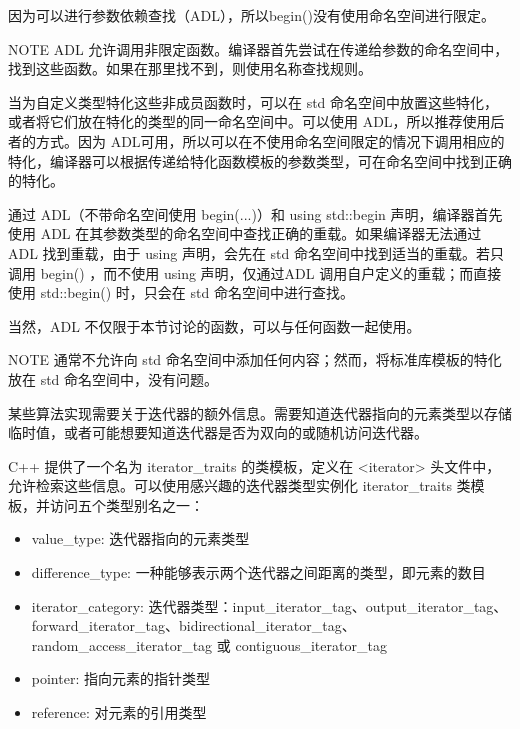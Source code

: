 因为可以进行参数依赖查找（ADL），所以begin()没有使用命名空间进行限定。

\begin{myNotic}{NOTE}
ADL 允许调用非限定函数。编译器首先尝试在传递给参数的命名空间中，找到这些函数。如果在那里找不到，则使用名称查找规则。
\end{myNotic}

当为自定义类型特化这些非成员函数时，可以在 std 命名空间中放置这些特化，或者将它们放在特化的类型的同一命名空间中。可以使用 ADL，所以推荐使用后者的方式。因为 ADL可用，所以可以在不使用命名空间限定的情况下调用相应的特化，编译器可以根据传递给特化函数模板的参数类型，可在命名空间中找到正确的特化。

通过 ADL（不带命名空间使用 begin(...)）和 using std::begin 声明，编译器首先使用 ADL 在其参数类型的命名空间中查找正确的重载。如果编译器无法通过 ADL 找到重载，由于 using 声明，会先在 std 命名空间中找到适当的重载。若只调用 begin() ，而不使用 using 声明，仅通过ADL 调用自户定义的重载；而直接使用 std::begin() 时，只会在 std 命名空间中进行查找。

当然，ADL 不仅限于本节讨论的函数，可以与任何函数一起使用。

\begin{myNotic}{NOTE}
通常不允许向 std 命名空间中添加任何内容；然而，将标准库模板的特化放在 std 命名空间中，没有问题。
\end{myNotic}


某些算法实现需要关于迭代器的额外信息。需要知道迭代器指向的元素类型以存储临时值，或者可能想要知道迭代器是否为双向的或随机访问迭代器。

C++ 提供了一个名为 iterator\_traits 的类模板，定义在 <iterator> 头文件中，允许检索这些信息。可以使用感兴趣的迭代器类型实例化 iterator\_traits 类模板，并访问五个类型别名之一：

\begin{itemize}
\item
value\_type: 迭代器指向的元素类型

\item
difference\_type: 一种能够表示两个迭代器之间距离的类型，即元素的数目

\item
iterator\_category: 迭代器类型：input\_iterator\_tag、output\_iterator\_tag、forward\_iterator\_tag、bidirectional\_iterator\_tag、random\_access\_iterator\_tag 或 contiguous\_iterator\_tag

\item
pointer: 指向元素的指针类型

\item
reference: 对元素的引用类型
\end{itemize}

